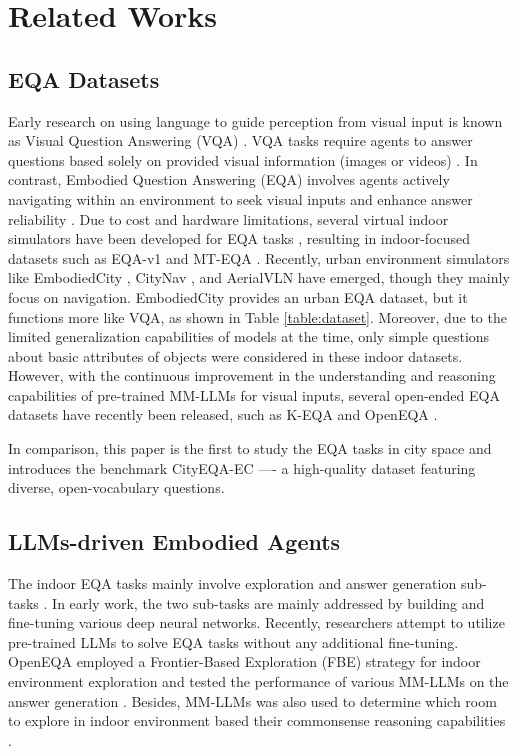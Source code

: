 \section{Related Works}
\label{related}

\subsection{EQA Datasets}
Early research on using language to guide perception from visual input is known as Visual Question Answering (VQA) \cite{ishmam2024image, guo2023images}. VQA tasks require agents to answer questions based solely on provided visual information (images or videos) \cite{chandrasegaranhourvideo}. In contrast, Embodied Question Answering (EQA) involves agents actively navigating within an environment to seek visual inputs and enhance answer reliability \cite{das2018embodied}. Due to cost and hardware limitations, several virtual indoor simulators have been developed for EQA tasks \cite{liu2024aligning}, resulting in indoor-focused datasets such as EQA-v1 \cite{das2018embodied} and MT-EQA \cite{yu2019multi}. Recently, urban environment simulators like EmbodiedCity \cite{gao2024embodiedcity}, CityNav \cite{lee2024citynav}, and AerialVLN \cite{liu2023aerialvln} have emerged, though they mainly focus on navigation. EmbodiedCity provides an urban EQA dataset, but it functions more like VQA, as shown in Table \ref{table:dataset}. Moreover, due to the limited generalization capabilities of models at the time, only simple questions about basic attributes of objects were considered in these indoor datasets\cite{ren2024explore}. However, with the continuous improvement in the understanding and reasoning capabilities of pre-trained MM-LLMs for visual inputs, several open-ended EQA datasets have recently been released, such as K-EQA \cite{tan2023knowledge} and OpenEQA \cite{majumdar2024openeqa}.

In comparison, this paper is the first to study the EQA tasks in city space and introduces the benchmark CityEQA-EC ---- a high-quality dataset featuring diverse, open-vocabulary questions.


\subsection{LLMs-driven Embodied Agents}

The indoor EQA tasks mainly involve exploration and answer generation sub-tasks \cite{ren2024explore}. In early work\cite{duan2022survey, das2018embodied, lu2019vilbert}, the two sub-tasks are mainly addressed by building and fine-tuning various deep neural networks. Recently, researchers attempt to utilize pre-trained LLMs to solve EQA tasks without any additional fine-tuning\cite{mu2024embodiedgpt, xiang2024language, huang2024manipvqa}. OpenEQA employed a Frontier-Based Exploration (FBE) strategy for indoor environment exploration and tested the performance of various MM-LLMs on the answer generation \cite{majumdar2024openeqa}. Besides, MM-LLMs was also used to determine which room to explore in indoor environment based their commonsense reasoning capabilities \cite{yinsgsg-nav}.

